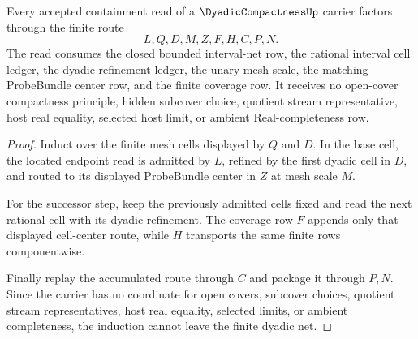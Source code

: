 \begin{theorem}
\label{thm:dyadic-compactness-finite-net-coverage}
Every accepted containment read of a $\DyadicCompactnessUp$ carrier factors through the finite route
$$
L,Q,D,M,Z,F,H,C,P,N.
$$
The read consumes the closed bounded interval-net row, the rational interval cell ledger, the dyadic refinement ledger, the unary mesh scale, the matching ProbeBundle center row, and the finite coverage row. It receives no open-cover compactness principle, hidden subcover choice, quotient stream representative, host real equality, selected host limit, or ambient Real-completeness row.
\end{theorem}
\begin{proof}
Induct over the finite mesh cells displayed by $Q$ and $D$. In the base cell, the located endpoint read is admitted by $L$, refined by the first dyadic cell in $D$, and routed to its displayed ProbeBundle center in $Z$ at mesh scale $M$.

For the successor step, keep the previously admitted cells fixed and read the next rational cell with its dyadic refinement. The coverage row $F$ appends only that displayed cell-center route, while $H$ transports the same finite rows componentwise.

Finally replay the accumulated route through $C$ and package it through $P,N$. Since the carrier has no coordinate for open covers, subcover choices, quotient stream representatives, host real equality, selected limits, or ambient completeness, the induction cannot leave the finite dyadic net.
\end{proof}

